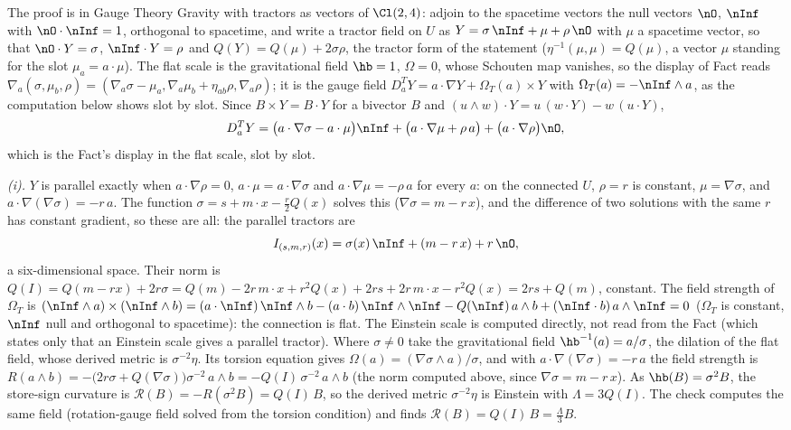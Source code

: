 The proof is in Gauge Theory Gravity with tractors as vectors of $\Cl(2,4)$: adjoin to the spacetime vectors the null vectors $\nO$, $\nInf$ with $\nO \cdot \nInf = 1$, orthogonal to spacetime, and write a tractor field on $U$ as $Y = \sigma\,\nInf + \mu + \rho\,\nO$ with $\mu$ a spacetime vector, so that $\nO \cdot Y = \sigma$, $\nInf \cdot Y = \rho$ and $Q(Y) = Q(\mu) + 2\sigma\rho$, the tractor form of the statement ($\eta^{-1}(\mu, \mu) = Q(\mu)$, a vector $\mu$ standing for the slot $\mu_{a} = a \cdot \mu$). The flat scale is the gravitational field $\hb = 1$, $\Omega = 0$, whose Schouten map vanishes, so the display of Fact  reads $\nabla_{a}(\sigma, \mu_{b}, \rho) = (\nabla_{a}\sigma - \mu_{a}, \nabla_{a}\mu_{b} + \eta_{ab}\rho, \nabla_{a}\rho)$; it is the gauge field $D^{T}_{a}Y = a \cdot \nabla Y + \Omega_{T}(a) \times Y$ with $\Omega_{T}(a) = -\nInf \wedge a$, as the computation below shows slot by slot. Since $B \times Y = B \cdot Y$ for a bivector $B$ and $(u \wedge w) \cdot Y = u\,(w \cdot Y) - w\,(u \cdot Y)$,
\[
D^{T}_{a}Y = \bigl(a \cdot \nabla\sigma - a \cdot \mu\bigr)\nInf + \bigl(a \cdot \nabla \mu + \rho\,a\bigr) + \bigl(a \cdot \nabla\rho\bigr)\nO ,
\]
which is the Fact's display in the flat scale, slot by slot.

\emph{(i).} $Y$ is parallel exactly when $a \cdot \nabla\rho = 0$, $a \cdot \mu = a \cdot \nabla\sigma$ and $a \cdot \nabla\mu = -\rho\,a$ for every $a$: on the connected $U$, $\rho = r$ is constant, $\mu = \nabla\sigma$, and $a \cdot \nabla(\nabla\sigma) = -r\,a$. The function $\sigma = s + m \cdot x - \tfrac{r}{2}Q(x)$ solves this ($\nabla\sigma = m - r\,x$), and the difference of two solutions with the same $r$ has constant gradient, so these are all: the parallel tractors are
\[
I_{(s,m,r)}(x) = \sigma(x)\,\nInf + (m - r\,x) + r\,\nO ,
\]
a six-dimensional space. Their norm is $Q(I) = Q(m - r x) + 2r\sigma = Q(m) - 2r\,m \cdot x + r^{2}Q(x) + 2rs + 2r\,m \cdot x - r^{2}Q(x) = 2rs + Q(m)$, constant. The field strength of $\Omega_{T}$ is $(\nInf \wedge a) \times (\nInf \wedge b) = (a \cdot \nInf)\,\nInf \wedge b - (a \cdot b)\,\nInf \wedge \nInf - Q(\nInf)\,a \wedge b + (\nInf \cdot b)\,a \wedge \nInf = 0$ ($\Omega_{T}$ is constant, $\nInf$ null and orthogonal to spacetime): the connection is flat. The Einstein scale is computed directly, not read from the Fact (which states only that an Einstein scale gives a parallel tractor). Where $\sigma \neq 0$ take the gravitational field $\hb^{-1}(a) = a/\sigma$, the dilation of the flat field, whose derived metric is $\sigma^{-2}\eta$. Its torsion equation gives $\Omega(a) = (\nabla\sigma \wedge a)/\sigma$, and with $a \cdot \nabla(\nabla\sigma) = -r\,a$ the field strength is $R(a \wedge b) = -\bigl(2r\sigma + Q(\nabla\sigma)\bigr)\sigma^{-2}\,a \wedge b = -Q(I)\,\sigma^{-2}\,a \wedge b$ (the norm computed above, since $\nabla\sigma = m - r\,x$). As $\hb(B) = \sigma^{2}B$, the store-sign curvature is $\mathcal{R}(B) = -R(\sigma^{2}B) = Q(I)\,B$, so the derived metric $\sigma^{-2}\eta$ is Einstein with $\Lambda = 3Q(I)$. The check computes the same field (rotation-gauge field solved from the torsion condition) and finds $\mathcal{R}(B) = Q(I)\,B = \tfrac{\Lambda}{3}B$.


